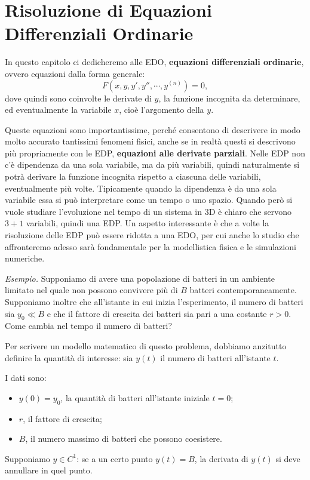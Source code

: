 \chapter{Risoluzione di Equazioni Differenziali Ordinarie}
\label{chap:edo}

In questo capitolo ci dedicheremo alle EDO, \textbf{equazioni differenziali ordinarie}, ovvero equazioni dalla forma generale:
\begin{equation*}
	F\left(x,y,y',y'',\cdots,y^{(n)} \right) = 0,
\end{equation*}
dove quindi sono coinvolte le derivate di $y$, la funzione incognita da determinare, ed eventualmente la variabile $x$, cioè l'argomento della $y$.

Queste equazioni sono importantissime, perché consentono di descrivere in modo molto accurato tantissimi fenomeni fisici, anche se in realtà questi si descrivono più propriamente con le EDP, \textbf{equazioni alle derivate parziali}.
Nelle EDP non c'è dipendenza da una sola variabile, ma da più variabili, quindi naturalmente si potrà derivare la funzione incognita rispetto a ciascuna delle variabili, eventualmente più volte.
Tipicamente quando la dipendenza è da una sola variabile essa si può interpretare come un tempo o uno spazio. Quando però si vuole studiare l'evoluzione nel tempo di un sistema in 3D è chiaro che servono $3+1$ variabili, quindi una EDP.
Un aspetto interessante è che a volte la risoluzione delle EDP può essere ridotta a una EDO, per cui anche lo studio che affronteremo adesso sarà fondamentale per la modellistica fisica e le simulazioni numeriche.

\textit{Esempio.}
Supponiamo di avere una popolazione di batteri in un ambiente limitato nel quale non possono convivere più di $B$ batteri contemporaneamente. Supponiamo inoltre che all'istante in cui inizia l'esperimento, il numero di batteri sia $y_{0} \ll B$ e che il fattore di crescita dei batteri sia pari a una costante $r >0$. Come cambia nel tempo il numero di batteri?

Per scrivere un modello matematico di questo problema, dobbiamo anzitutto definire la quantità di interesse: sia $y(t)$ il numero di batteri all'istante $t$.

I dati sono:
\begin{itemize}
\item $y(0) =y_{0}$, la quantità di batteri all'istante iniziale $t=0$;
\item $r$, il fattore di crescita;
\item $B$, il numero massimo di batteri che possono coesistere.
\end{itemize}
Supponiamo $y \in C^{1} $: se a un certo punto $y(t) =B$, la derivata di $y(t)$ si deve annullare in quel punto.

